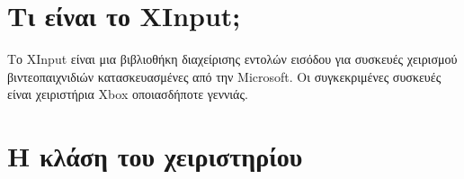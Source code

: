 



\section{Τι είναι το XInput;}
Το XInput είναι μια βιβλιοθήκη διαχείρισης εντολών εισόδου για
συσκευές χειρισμού βιντεοπαιχνιδιών κατασκευασμένες από την Microsoft.
Οι συγκεκριμένες συσκευές είναι χειριστήρια Xbox οποιασδήποτε γεννιάς.

\section{Η κλάση του χειριστηρίου}
